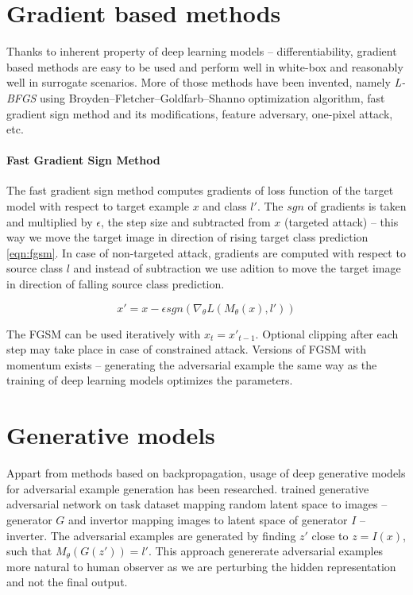 \section{Gradient based methods}
Thanks to inherent property of deep learning models -- differentiability, gradient based methods are easy to be used and perform well in white-box and reasonably well in surrogate scenarios. More of those methods have been invented, namely \textit{L-BFGS} using Broyden–Fletcher–Goldfarb–Shanno optimization algorithm, fast gradient sign method and its modifications, feature adversary, one-pixel attack, etc.

\paragraph{Fast Gradient Sign Method}
The fast gradient sign method computes gradients of loss function of the target model  with respect to target example $x$ and class $l'$. The $sgn$ of gradients is taken and multiplied by $\epsilon$, the step size and subtracted from $x$ (targeted attack) -- this way we move the target image in direction of rising target class prediction \ref{eqn:fgsm}. In case of non-targeted attack, gradients are computed with respect to source class $l$ and instead of subtraction we use adition to move the target image in direction of falling source class prediction.

\begin{equation} \label{eqn:fgsm}
x' = x - \epsilon sgn(\nabla_\theta L(M_\theta(x), l'))
\end{equation}

The FGSM can be used iteratively with $x_t = x'_{t-1}$. Optional clipping after each step may take place in case of constrained attack. Versions of FGSM with momentum exists -- generating the adversarial example the same way as the training of deep learning models optimizes the parameters.

\section{Generative models}
Appart from methods based on backpropagation, usage of deep generative models for adversarial example generation has been researched. \cite{gan-advex} trained generative adversarial network on task dataset mapping random latent space to images -- generator $G$ and invertor mapping images to latent space of generator $I$ -- inverter. The adversarial examples are generated by finding $z'$ close to $z = I(x)$, such that $M_\theta(G(z')) = l'$. This approach genererate adversarial examples more natural to human observer as we are perturbing the hidden representation and not the final output.
